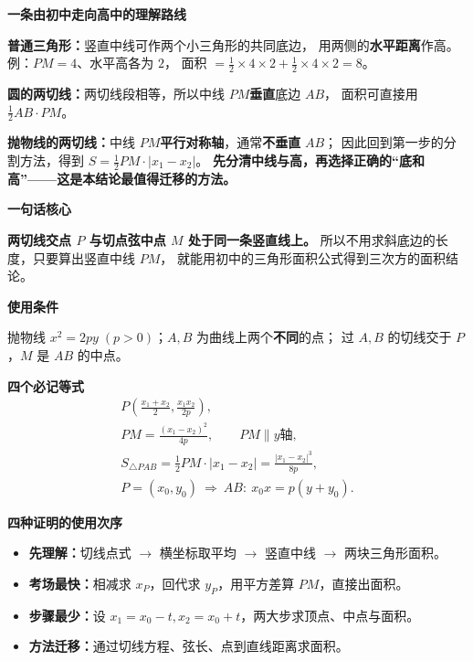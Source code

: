 \begin{summarybox}

    \textbf{\textcolor{CSummary}{一条由初中走向高中的理解路线}}

    \textbf{普通三角形：}竖直中线可作两个小三角形的共同底边，
    用两侧的\textbf{水平距离}作高。例：$PM=4$、水平高各为 $2$，
    面积 $=\tfrac12\times4\times2+\tfrac12\times4\times2=8$。

    \textbf{圆的两切线：}两切线段相等，所以中线 $PM$\textbf{垂直}底边 $AB$，
    面积可直接用 $\tfrac12 AB\cdot PM$。

    \textbf{抛物线的两切线：}中线 $PM$\textbf{平行对称轴}，通常\textbf{不垂直} $AB$；
    因此回到第一步的分割方法，得到
    $S=\tfrac12 PM\cdot|x_1-x_2|$。
    \textbf{先分清中线与高，再选择正确的“底和高”——这是本结论最值得迁移的方法。}

    \medskip

    \textbf{\textcolor{CSummary}{一句话核心}}

    \textbf{两切线交点 $P$ 与切点弦中点 $M$ 处于同一条竖直线上。}
    所以不用求斜底边的长度，只要算出竖直中线 $PM$，
    就能用初中的三角形面积公式得到三次方的面积结论。

    \medskip
    \textbf{\textcolor{CSummary}{使用条件}}

    抛物线 $x^2=2py\;(p>0)$；$A,B$ 为曲线上两个\textbf{不同}的点；
    过 $A,B$ 的切线交于 $P$，$M$ 是 $AB$ 的中点。

    \medskip
    \textbf{\textcolor{CSummary}{四个必记等式}}
    \[
    \boxed{\begin{gathered}
        P\left(\frac{x_1+x_2}{2},\frac{x_1x_2}{2p}\right),\\[3pt]
        PM=\frac{(x_1-x_2)^2}{4p},\qquad PM\parallel y\text{轴},\\[3pt]
        S_{\triangle PAB}=\frac12 PM\cdot|x_1-x_2|
        =\frac{|x_1-x_2|^3}{8p},\\[3pt]
        P=(x_0,y_0)\ \Longrightarrow\ AB:\ x_0x=p(y+y_0).
    \end{gathered}}
    \]

    \medskip
    \textbf{\textcolor{CSummary}{四种证明的使用次序}}
    \begin{itemize}[leftmargin=*, itemsep=0.35em, topsep=0.3em]
        \item \textbf{先理解：}切线点式 $\to$ 横坐标取平均 $\to$ 竖直中线 $\to$ 两块三角形面积。
        \item \textbf{考场最快：}相减求 $x_P$，回代求 $y_P$，用平方差算 $PM$，直接出面积。
        \item \textbf{步骤最少：}设 $x_1=x_0-t,x_2=x_0+t$，两大步求顶点、中点与面积。
        \item \textbf{方法迁移：}通过切线方程、弦长、点到直线距离求面积。
    \end{itemize}


\end{summarybox}

